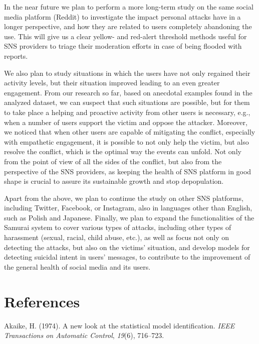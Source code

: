 \documentclass[10pt,dvipsnames]{scrartcl}
\begin{document}
In the near future we plan to perform a more long-term study on the same
social media platform (Reddit) to investigate the impact personal
attacks have in a longer perspective, and how they are related to users
completely abandoning the use. This will give us a clear yellow- and
red-alert threshold methods useful for SNS providers to triage their
moderation efforts in case of being flooded with reports.

We also plan to study situations in which the users have not only
regained their activity levels, but their situation improved leading to
an even greater engagement. From our research so far, based on anecdotal
examples found in the analyzed dataset, we can suspect that such
situations are possible, but for them to take place a helping and
proactive activity from other users is necessary, e.g., when a number of
users support the victim and oppose the attacker. Moreover, we noticed
that when other users are capable of mitigating the conflict, especially
with empathetic engagement, it is possible to not only help the victim,
but also resolve the conflict, which is the optimal way the events can
unfold. Not only from the point of view of all the sides of the
conflict, but also from the perspective of the SNS providers, as keeping
the health of SNS platform in good shape is crucial to assure its
sustainable growth and stop depopulation.

Apart from the above, we plan to continue the study on other SNS
platforms, including Twitter, Facebook, or Instagram, also in languages
other than English, such as Polish and Japanese. Finally, we plan to
expand the functionalities of the \textsf{ Samurai} system to cover
various types of attacks, including other types of harassment (sexual,
racial, child abuse, etc.), as well as focus not only on detecting the
attacks, but also on the victims' situation, and develop models for
detecting suicidal intent in users' messages, to contribute to the
improvement of the general health of social media and its users.

\newpage

\section*{References}

\hypertarget{refs}{}
\hypertarget{ref-Akaike1974model}{}
Akaike, H. (1974). A new look at the statistical model identification.
\emph{IEEE Transactions on Automatic Control}, \emph{19}(6), 716--723.
\end{document}
